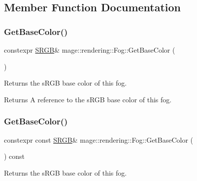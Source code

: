 \subsection{Member Function Documentation}
\hypertarget{classmage_1_1rendering_1_1_fog_a514b3e11c7c3eb64b2b696278442eee6}{}\label{classmage_1_1rendering_1_1_fog_a514b3e11c7c3eb64b2b696278442eee6} 
\subsubsection{\texorpdfstring{Get\+Base\+Color()}{GetBaseColor()}\hspace{0.1cm}{\footnotesize\ttfamily [1/2]}}
{\footnotesize\ttfamily constexpr \hyperlink{structmage_1_1_s_r_g_b}{S\+R\+GB}\& mage\+::rendering\+::\+Fog\+::\+Get\+Base\+Color (\begin{DoxyParamCaption}{ }\end{DoxyParamCaption})\hspace{0.3cm}{\ttfamily [noexcept]}}

Returns the s\+R\+GB base color of this fog.

\begin{DoxyReturn}{Returns}
A reference to the s\+R\+GB base color of this fog. 
\end{DoxyReturn}
\hypertarget{classmage_1_1rendering_1_1_fog_af8ab44c1cb0667ae4a439e2798f2e9e4}{}\label{classmage_1_1rendering_1_1_fog_af8ab44c1cb0667ae4a439e2798f2e9e4} 
\subsubsection{\texorpdfstring{Get\+Base\+Color()}{GetBaseColor()}\hspace{0.1cm}{\footnotesize\ttfamily [2/2]}}
{\footnotesize\ttfamily constexpr const \hyperlink{structmage_1_1_s_r_g_b}{S\+R\+GB}\& mage\+::rendering\+::\+Fog\+::\+Get\+Base\+Color (\begin{DoxyParamCaption}{ }\end{DoxyParamCaption}) const\hspace{0.3cm}{\ttfamily [noexcept]}}

Returns the s\+R\+GB base color of this fog.

